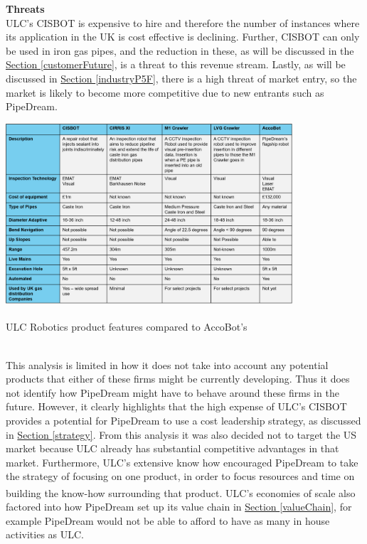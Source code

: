\documentclass[11pt]{article}		%
\newcommand{\supercite}[1]{\textsuperscript{\cite{#1}}}		%
\newcommand{\sectref}[1]{\hyperref[#1]{Section \ref*{#1}}}     %
\begin{document}
	        \textbf{Threats}
	        \\
	        ULC's CISBOT is expensive to hire and therefore the number of instances where its application in the UK is cost effective is declining. Further, CISBOT can only be used in iron gas pipes, and the reduction in these, as will be discussed in the \sectref{customerFuture}, is a threat to this revenue stream. Lastly, as will be discussed in \sectref{industryP5F}, there is a high threat of market entry, so the market is likely to become more competitive due to new entrants such as PipeDream.
            \begin{table}[h]
				\centering
				\includegraphics[width=0.8\textwidth]{ULC_robot_comparison_formatted}
				\caption{ULC Robotics product features compared to AccoBot's\supercite{ULC_Robots}}
				\label{ULCFeatures}
			\end{table}
			\\
            \hspace*{3ex}This analysis is limited in how it does not take into account any potential products that either of these firms might be currently developing. Thus it does not identify how PipeDream might have to behave around these firms in the future. However, it clearly highlights that the high expense of ULC's CISBOT provides a potential for PipeDream to use a cost leadership strategy, as discussed in \sectref{strategy}. From this analysis it was also decided not to target the US market because ULC already has substantial competitive advantages in that market. Furthermore, ULC's extensive know how encouraged PipeDream to take the strategy of focusing on one product, in order to focus resources and time on building the know-how surrounding that product\supercite{Barney}. ULC's economies of scale also factored into how PipeDream set up its value chain in \sectref{valueChain}, for example PipeDream would not be able to afford to have as many in house activities as ULC.
\end{document}
